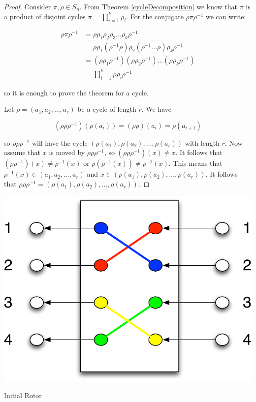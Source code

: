 \begin{proof}
Consider $\pi, \rho \in S_n$. From Theorem \ref{cycleDecomposition} we know that $\pi$ is a product of disjoint cycles $\pi = \prod^k_{i=1} \rho_i$. For the conjugate $\rho \pi \rho^{-1}$ we can write:

\begin{align*}
\rho \pi \rho^{-1} &= \rho \rho_1 \rho_2 \rho_3 \ldots \rho_k \rho^{-1} \\
&= \rho \rho_1 (\rho^{-1}\rho) \rho_2 (\rho^{-1} \ldots \rho) \rho_k \rho^{-1} \\
&= (\rho \rho_1 \rho^{-1}) (\rho \rho_2 \rho^{-1}) \ldots (\rho \rho_k \rho^{-1}) \\
&= \prod\limits^k_{i=1} \rho \rho_i \rho^{-1}
\end{align*}

so it is enough to prove the theorem for a cycle.

Let $\rho = (a_1, a_2, \ldots, a_r)$ be a cycle of length $r$. We have

$$
(\rho \rho \rho^{-1}) (\rho(a_i)) = (\rho \rho) (a_i) = \rho(a_{i+1}) 
$$

so $\rho \rho \rho^{-1}$ will have the cycle $(\rho(a_1), \rho(a_2), \ldots, \rho(a_r))$ with length $r$. Now assume that $x$ is moved by $\rho \rho \rho^{-1}$, so $(\rho \rho \rho^{-1})(x) \neq x$. It follows that $(\rho \rho^{-1})(x) \neq \rho^{-1} (x)$ or $\rho (\rho^{-1} (x)) \neq \rho^{-1} (x)$. This means that $\rho^{-1} (x) \in (a_1, a_2, \ldots, a_r)$ and $x \in (\rho(a_1), \rho(a_2), \ldots, \rho(a_r))$. It follows that $\rho \rho \rho^{-1} = (\rho(a_1), \rho(a_2), \ldots, \rho(a_r))$.

\end{proof}

\begin{marginfigure}[0.5in]
\includegraphics[scale=0.4]{rotorMotionBefore.pdf}
\caption{Initial Rotor}
\label{fig:rotorMotionBefore}
\end{marginfigure}

